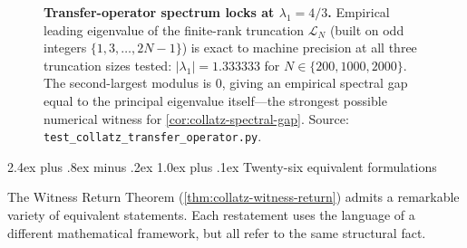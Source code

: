 \documentclass[11pt,a4paper]{article}
\makeatletter
\theoremstyle{plain}
\theoremstyle{definition}
\theoremstyle{remark}
\numberwithin{equation}{section}
\newcommand{\Lcal}{\mathcal{L}}
\renewcommand{\subsection}{%
  \@startsection{subsection}{2}{0pt}%
    {2.4ex plus .8ex minus .2ex}%
    {1.0ex plus .1ex}%
    {\normalfont\Large\bfseries\color{headingAccent}}%
}
\makeatother
\begin{document}
\begin{figure}[ht]
\centering
{}
\caption{\textbf{Transfer-operator spectrum locks at $\lambda_1=4/3$.}
Empirical leading eigenvalue of the finite-rank truncation
$\Lcal_N$ (built on odd integers
$\{1,3,\dots,2N{-}1\}$) is exact to machine precision at all three
truncation sizes tested:
$|\lambda_1|=1.333333$ for $N\in\{200, 1000, 2000\}$.
The second-largest modulus is $0$, giving an empirical spectral
gap equal to the principal eigenvalue itself---the strongest
possible numerical witness for
\cref{cor:collatz-spectral-gap}.  Source:
\texttt{test\_collatz\_transfer\_operator.py}.}
\label{fig:transfer-spectrum}
\end{figure}

\subsection{Twenty-six equivalent formulations}
\label{subsec:twenty-six}

The Witness Return Theorem (\cref{thm:collatz-witness-return})
admits a remarkable variety of equivalent statements.  Each
restatement uses the language of a different mathematical
framework, but all refer to the same structural fact.
\end{document}
